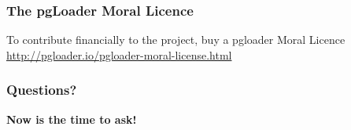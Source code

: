 \documentclass{beamer}
\begin{document}
{
  \begin{frame}
    \frametitle{The pgLoader Moral Licence}

    \begin{Large}
      \begin{center}
        To contribute financially to the project, buy a
        \vfill
        pgloader Moral Licence
        \vfill
        \url{http://pgloader.io/pgloader-moral-license.html}
      \end{center}
    \end{Large}
    \vfill
  \end{frame}
}

{
 
  \begin{frame}
    \frametitle{Questions?}

    \begin{center}
      \textbf{\Large Now is the time to ask!}
    \end{center}
  \end{frame}
}
\end{document}
